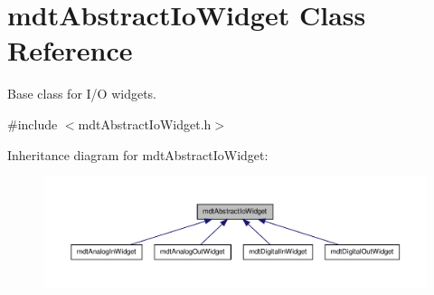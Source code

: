 \hypertarget{classmdt_abstract_io_widget}{
\section{mdtAbstractIoWidget Class Reference}
\label{classmdt_abstract_io_widget}
}


Base class for I/O widgets.  




{\ttfamily \#include $<$mdtAbstractIoWidget.h$>$}



Inheritance diagram for mdtAbstractIoWidget:
\nopagebreak
\begin{figure}[H]
\begin{center}
\leavevmode
\includegraphics[width=400pt]{classmdt_abstract_io_widget__inherit__graph}
\end{center}
\end{figure}
